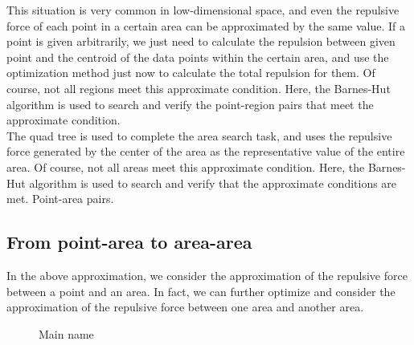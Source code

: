 \noindent This situation is very common in low-dimensional space, and even the repulsive force of each point in a certain area can be approximated by the same value. If a point is given arbitrarily, we just need to calculate the repulsion between given point and the centroid of the data points within the certain area, and use the optimization method just now to calculate the total repulsion for them. Of course, not all regions meet this approximate condition. Here, the Barnes-Hut algorithm is used to search and verify the point-region pairs that meet the approximate condition.\\

The quad tree is used to complete the area search task\cite{ref9}, and uses the repulsive force generated by the center of the area as the representative value of the entire area. Of course, not all areas meet this approximate condition. Here, the Barnes-Hut algorithm is used to search and verify that the approximate conditions are met. Point-area pairs.

\subsection{From point-area to area-area}

\noindent In the above approximation, we consider the approximation of the repulsive force between a point and an area. In fact, we can further optimize and consider the approximation of the repulsive force between one area and another area.
\\

\begin{figure}[H]
\centering  %
\caption{Main name}
\label{Fig.main}
\end{figure}

